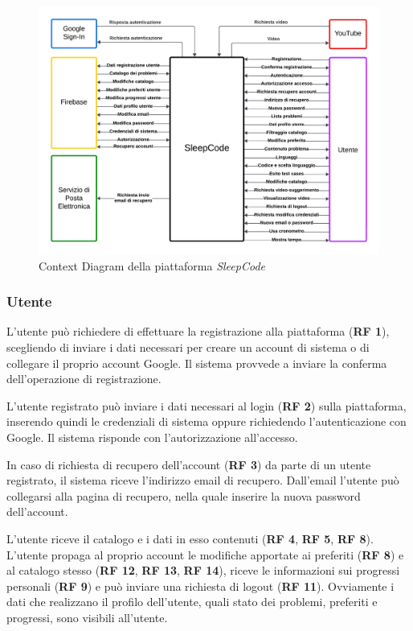 \documentclass[11pt, a4paper]{article}
\theoremstyle{definition} %
\begin{document}
\begin{figure}[H]
\centering
\hspace*{-2.4cm}
\includegraphics[scale=0.65]{materiale/contextdiagram.pdf}
\caption{Context Diagram della piattaforma \textit{SleepCode}}
\label{contextdiagram}
\end{figure}

\subsubsection*{Utente}
L'utente può richiedere di effettuare la registrazione alla piattaforma
(\textbf{RF 1}), scegliendo di inviare i dati necessari per creare un
account di sistema o di collegare il proprio account Google. Il sistema
provvede a inviare la conferma dell'operazione di registrazione.

L'utente registrato può inviare i dati necessari al login (\textbf{RF 2}) sulla piattaforma,
inserendo quindi le credenziali di sistema oppure richiedendo l'autenticazione
con Google. Il sistema risponde con l'autorizzazione all'accesso.

In caso di richiesta di recupero dell'account (\textbf{RF 3}) da parte di un utente
registrato, il sistema riceve l'indirizzo email di recupero. Dall'email
l'utente può collegarsi alla pagina di recupero, nella quale inserire la
nuova password dell'account.

L'utente riceve il catalogo e i dati in esso contenuti (\textbf{RF 4}, \textbf{RF 5},
\textbf{RF 8}). L'utente propaga al proprio account le modifiche
apportate ai preferiti (\textbf{RF 8}) e al catalogo stesso (\textbf{RF 12}, \textbf{RF 13}, \textbf{RF 14}), riceve le informazioni sui progressi personali (\textbf{RF 9})
e può inviare una richiesta di logout (\textbf{RF 11}). Ovviamente
i dati che realizzano il profilo dell'utente, quali stato dei problemi,
preferiti e progressi, sono visibili all'utente.
\end{document}
